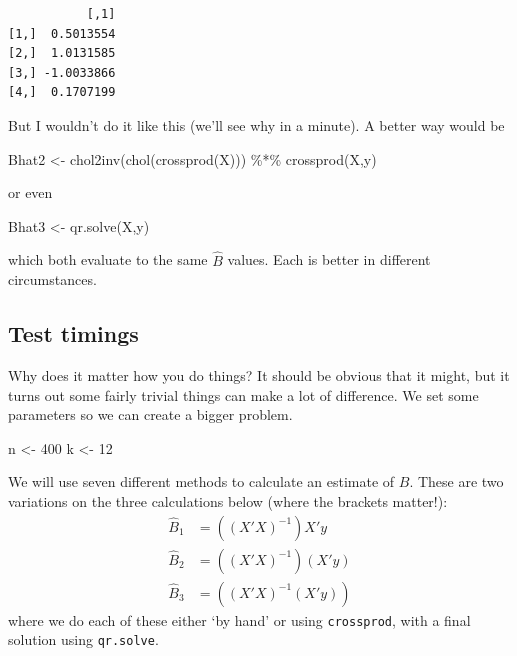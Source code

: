 \documentclass[
  letterpaper,
]{book}
\newenvironment{Shaded}{\begin{snugshade}}{\end{snugshade}}
\newcommand{\DecValTok}[1]{\textcolor[rgb]{0.68,0.00,0.00}{#1}}
\newcommand{\FunctionTok}[1]{\textcolor[rgb]{0.28,0.35,0.67}{#1}}
\newcommand{\NormalTok}[1]{\textcolor[rgb]{0.00,0.23,0.31}{#1}}
\newcommand{\OtherTok}[1]{\textcolor[rgb]{0.00,0.23,0.31}{#1}}
\newcommand{\SpecialCharTok}[1]{\textcolor[rgb]{0.37,0.37,0.37}{#1}}
\begin{document}
\begin{verbatim}
           [,1]
[1,]  0.5013554
[2,]  1.0131585
[3,] -1.0033866
[4,]  0.1707199
\end{verbatim}

But I wouldn't do it like this (we'll see why in a minute). A better way
would be

\begin{Shaded}
\begin{Highlighting}[]
\NormalTok{Bhat2 }\OtherTok{\textless{}{-}} \FunctionTok{chol2inv}\NormalTok{(}\FunctionTok{chol}\NormalTok{(}\FunctionTok{crossprod}\NormalTok{(X))) }\SpecialCharTok{\%*\%} \FunctionTok{crossprod}\NormalTok{(X,y)}
\end{Highlighting}
\end{Shaded}

or even

\begin{Shaded}
\begin{Highlighting}[]
\NormalTok{Bhat3 }\OtherTok{\textless{}{-}} \FunctionTok{qr.solve}\NormalTok{(X,y)}
\end{Highlighting}
\end{Shaded}

which both evaluate to the same \(\hat B\) values. Each is better in
different circumstances.

\hypertarget{test-timings}{%
\subsection{Test timings}\label{test-timings}}

Why does it matter how you do things? It should be obvious that it
might, but it turns out some fairly trivial things can make a lot of
difference. We set some parameters so we can create a bigger problem.

\begin{Shaded}
\begin{Highlighting}[]
\NormalTok{n }\OtherTok{\textless{}{-}} \DecValTok{400}
\NormalTok{k }\OtherTok{\textless{}{-}} \DecValTok{12}
\end{Highlighting}
\end{Shaded}

We will use seven different methods to calculate an estimate of \(B\).
These are two variations on the three calculations below (where the
brackets matter!): \begin{align}
\hat B_1 &= ((X'X)^{-1}) X'y \\
\hat B_2 &= ((X'X)^{-1}) (X'y) \\
\hat B_3 &= ((X'X)^{-1} (X'y))
\end{align} where we do each of these either `by hand' or using
\texttt{crossprod}, with a final solution using \texttt{qr.solve}.
\end{document}
